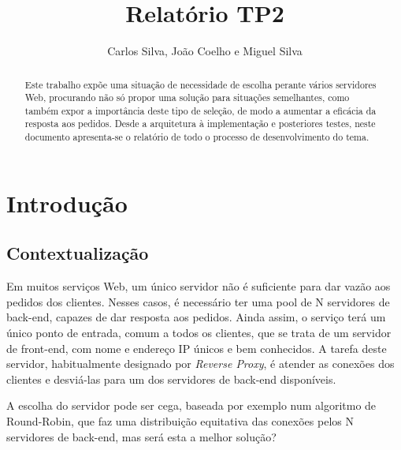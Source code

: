 \documentclass{llncs}
\begin{document}
\title{Relatório TP2}
\author{Carlos Silva, João Coelho e Miguel Silva}


\date{}


\maketitle

\begin{abstract}
Este trabalho expõe uma situação de necessidade de escolha perante vários servidores Web, procurando não só propor uma solução para situações semelhantes, como também expor a importância deste tipo de seleção, de modo a aumentar a eficácia da resposta aos pedidos. Desde a arquitetura à implementação e posteriores testes, neste documento apresenta-se o relatório de todo o processo de desenvolvimento do tema.
\end{abstract}

\newpage

\section{Introdução}

\subsection{Contextualização}

Em muitos serviços Web, um único servidor não é suficiente para dar vazão aos pedidos dos clientes. Nesses casos, é necessário ter uma pool de N servidores de back-end, capazes de dar resposta aos pedidos. Ainda assim, o serviço terá um único ponto de entrada, comum a todos os
clientes, que se trata de um servidor de front-end, com nome e endereço IP únicos e bem conhecidos. A tarefa deste servidor, habitualmente designado por \textit{Reverse Proxy}, é atender as conexões dos clientes e desviá-las para um dos servidores de back-end disponíveis.\par
A escolha do servidor pode ser cega, baseada por exemplo num algoritmo de Round-Robin, que faz uma distribuição equitativa das conexões pelos N servidores de back-end, mas será esta a melhor solução?
\end{document}
